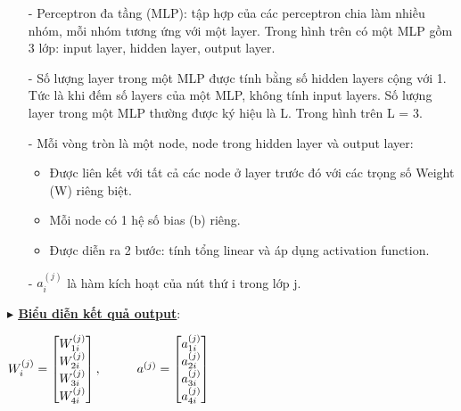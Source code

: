 \documentclass{report}
\newcommand\tab[1][1.25cm]{\hspace*{#1}}
\begin{document}
            \begin{enumerate}
                \item [- ] Perceptron đa tầng (MLP): tập hợp của các perceptron chia làm nhiều nhóm, mỗi nhóm tương ứng với một layer. Trong hình trên có một MLP gồm 3 lớp: input layer, hidden layer, output layer.
                \item [- ] Số lượng layer trong một MLP được tính bằng số hidden layers cộng với 1. Tức là khi đếm số layers của một MLP, không tính input layers. Số lượng layer trong một MLP thường được ký hiệu là L. Trong hình trên L = 3.
                \item [- ] Mỗi vòng tròn là một node, node trong hidden layer và output layer:
                    \begin{itemize}
                        \item Được liên kết với tất cả các node ở layer trước đó với các trọng số Weight (W) riêng biệt.
                        \item Mỗi node có 1 hệ số bias (b) riêng.
                        \item Được diễn ra 2 bước: tính tổng linear và áp dụng activation function.
                    \end{itemize}
                \item [- ] $a_i^{(j)}$ là hàm kích hoạt của nút thứ i trong lớp j.
            \end{enumerate}

\pagebreak
            \fontsize{13}{10}\selectfont\textbf{$\blacktriangleright$ \underline{\underline{{Biểu diễn kết quả output}}}}:
            \begin{center}
                $W_i^{(j)} = 
                \begin{bmatrix}
                    W_{1i}^{(j)} \\ W_{2i}^{(j)} \\ W_{3i}^{(j)} \\ W_{4i}^{(j)} \\ 
                \end{bmatrix}, \tab[1cm] a^{(j)} = 
                \begin{bmatrix}
                    a_{1i}^{(j)} \\ a_{2i}^{(j)} \\ a_{3i}^{(j)} \\ a_{4i}^{(j)} \\ 
                \end{bmatrix}$
            \end{center}
            
\end{document}

